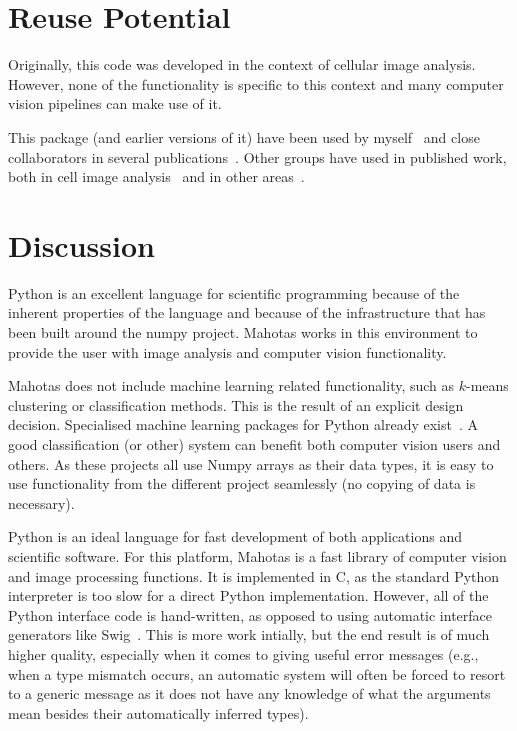 \documentclass{scrartcl}
\newcommand*{\cpp}{{C\nolinebreak[4]\hspace{-.05em}\raisebox{.4ex}{\tiny\textbf{++}}}}
\begin{document}
\section{Reuse Potential}

Originally, this code was developed in the context of cellular image analysis.
However, none of the functionality is specific to this context and many
computer vision pipelines can make use of it.

This package (and earlier versions of it) have been used by
myself~\citep{Coelho2009,Coelho2010a} and close collaborators in several
publications~\citep{omerosearcher}. Other groups have used in published work,
both in cell image analysis~\citep{CYTO:CYTO22034} and in other
areas~\citep{springerlink:10.1007/978-3-642-32335-5_2}.

\section{Discussion}

Python is an excellent language for scientific programming because of the
inherent properties of the language and because of the infrastructure that has
been built around the numpy project. Mahotas works in this environment to
provide the user with image analysis and computer vision functionality.

Mahotas does not include machine learning related functionality, such as
$k$-means clustering or classification methods. This is the result of an
explicit design decision. Specialised machine learning packages for Python
already
exist~\citep{Pedregosa:2011:SML:2078183.2078195,springerlink:10.1007/978-3-540-30116-5_58,Schaul:2010:PYB:1756006.1756030,Sonnenburg:2010:SML:1756006.1859911}.
A good classification (or other) system can benefit both computer vision users
and others. As these projects all use Numpy arrays as their data types, it is
easy to use functionality from the different project seamlessly (no copying of
data is necessary).

Python is an ideal language for fast development of both applications and
scientific software. For this platform, Mahotas is a fast library of computer
vision and image processing functions. It is implemented in \cpp{}, as the
standard Python interpreter is too slow for a direct Python implementation.
However, all of the Python interface code is hand-written, as opposed to using
automatic interface generators like Swig~\citep{Beazley2003599}. This is more
work intially, but the end result is of much higher quality, especially when it
comes to giving useful error messages (e.g., when a type mismatch occurs, an
automatic system will often be forced to resort to a generic message as it does
not have any knowledge of what the arguments mean besides their automatically
inferred types).
\end{document}
